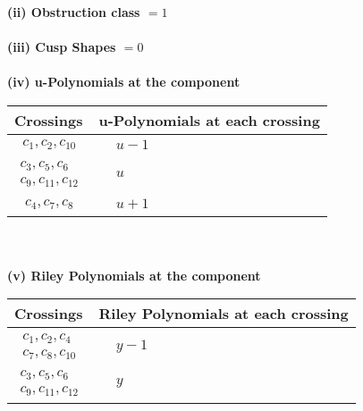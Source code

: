 \documentclass[1p]{elsarticle_modified}
\theoremstyle{definition}
\begin{document}
\flushleft \textbf{(ii) Obstruction class $= 1$}\\~\\
\flushleft \textbf{(iii) Cusp Shapes $= 0$}\\~\\
\newpage\renewcommand{\arraystretch}{1}
\flushleft \textbf{(iv) u-Polynomials at the component}\newline \\
\begin{tabular}{m{50pt}|m{274pt}}
Crossings & \hspace{64pt}u-Polynomials at each crossing \\
\hline $$\begin{aligned}c_{1},c_{2},c_{10}\end{aligned}$$&$\begin{aligned}
&u-1
\end{aligned}$\\
\hline $$\begin{aligned}c_{3},c_{5},c_{6}\\c_{9},c_{11},c_{12}\end{aligned}$$&$\begin{aligned}
&u
\end{aligned}$\\
\hline $$\begin{aligned}c_{4},c_{7},c_{8}\end{aligned}$$&$\begin{aligned}
&u+1
\end{aligned}$\\
\hline
\end{tabular}\\~\\
\newpage\renewcommand{\arraystretch}{1}
\flushleft \textbf{(v) Riley Polynomials at the component}\newline \\
\begin{tabular}{m{50pt}|m{274pt}}
Crossings & \hspace{64pt}Riley Polynomials at each crossing \\
\hline $$\begin{aligned}c_{1},c_{2},c_{4}\\c_{7},c_{8},c_{10}\end{aligned}$$&$\begin{aligned}
&y-1
\end{aligned}$\\
\hline $$\begin{aligned}c_{3},c_{5},c_{6}\\c_{9},c_{11},c_{12}\end{aligned}$$&$\begin{aligned}
&y
\end{aligned}$\\
\hline
\end{tabular}\\~\\
\end{document}
